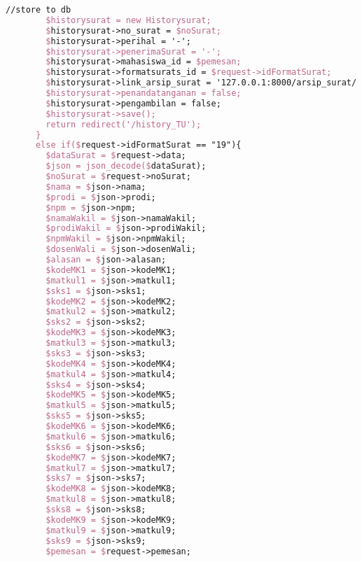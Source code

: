 \begin{lstlisting}[language=tex,basicstyle=\tiny,caption=HistorysuratController.php]
        //store to db
        $historysurat = new Historysurat;
        $historysurat->no_surat = $noSurat;
        $historysurat->perihal = '-';
        $historysurat->penerimaSurat = '-';
        $historysurat->mahasiswa_id = $pemesan;
        $historysurat->formatsurats_id = $request->idFormatSurat;
        $historysurat->link_arsip_surat = '127.0.0.1:8000/arsip_surat/' . $noSurat. '_' . $npm . '_surat_perwakilan_perwalian_8mk.pdf';
        $historysurat->penandatanganan = false;
        $historysurat->pengambilan = false;
        $historysurat->save();
        return redirect('/history_TU');
      }
      else if($request->idFormatSurat == "19"){
        $dataSurat = $request->data;
        $json = json_decode($dataSurat);
        $noSurat = $request->noSurat;
        $nama = $json->nama;
        $prodi = $json->prodi;
        $npm = $json->npm;
        $namaWakil = $json->namaWakil;
        $prodiWakil = $json->prodiWakil;
        $npmWakil = $json->npmWakil;
        $dosenWali = $json->dosenWali;
        $alasan = $json->alasan;
        $kodeMK1 = $json->kodeMK1;
        $matkul1 = $json->matkul1;
        $sks1 = $json->sks1;
        $kodeMK2 = $json->kodeMK2;
        $matkul2 = $json->matkul2;
        $sks2 = $json->sks2;
        $kodeMK3 = $json->kodeMK3;
        $matkul3 = $json->matkul3;
        $sks3 = $json->sks3;
        $kodeMK4 = $json->kodeMK4;
        $matkul4 = $json->matkul4;
        $sks4 = $json->sks4;
        $kodeMK5 = $json->kodeMK5;
        $matkul5 = $json->matkul5;
        $sks5 = $json->sks5;
        $kodeMK6 = $json->kodeMK6;
        $matkul6 = $json->matkul6;
        $sks6 = $json->sks6;
        $kodeMK7 = $json->kodeMK7;
        $matkul7 = $json->matkul7;
        $sks7 = $json->sks7;
        $kodeMK8 = $json->kodeMK8;
        $matkul8 = $json->matkul8;
        $sks8 = $json->sks8;
        $kodeMK9 = $json->kodeMK9;
        $matkul9 = $json->matkul9;
        $sks9 = $json->sks9;
        $pemesan = $request->pemesan;


\end{lstlisting}
